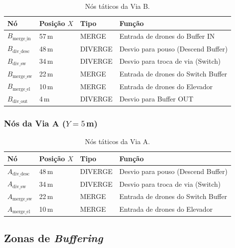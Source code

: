 \documentclass[12pt,a4paper]{article}
\begin{document}
\begin{table}[H]
\centering
\caption{Nós táticos da Via B.}
\label{tab:nos_via_b}
\begin{tabular}{@{}llll@{}}
\toprule
\textbf{Nó} & \textbf{Posição $X$} & \textbf{Tipo} & \textbf{Função} \\
\midrule
$B_{\text{merge\_in}}$  & 57\,m & MERGE   & Entrada de drones do Buffer IN \\
$B_{\text{div\_desc}}$  & 48\,m & DIVERGE & Desvio para pouso (Descend Buffer) \\
$B_{\text{div\_sw}}$    & 34\,m & DIVERGE & Desvio para troca de via (Switch) \\
$B_{\text{merge\_sw}}$  & 22\,m & MERGE   & Entrada de drones do Switch Buffer \\
$B_{\text{merge\_el}}$  & 10\,m & MERGE   & Entrada de drones do Elevador \\
$B_{\text{div\_out}}$   &  4\,m & DIVERGE & Desvio para Buffer OUT \\
\bottomrule
\end{tabular}
\end{table}

\subsubsection{Nós da Via A ($Y = 5$\,m)}

\begin{table}[H]
\centering
\caption{Nós táticos da Via A.}
\label{tab:nos_via_a}
\begin{tabular}{@{}llll@{}}
\toprule
\textbf{Nó} & \textbf{Posição $X$} & \textbf{Tipo} & \textbf{Função} \\
\midrule
$A_{\text{div\_desc}}$  & 48\,m & DIVERGE & Desvio para pouso (Descend Buffer) \\
$A_{\text{div\_sw}}$    & 34\,m & DIVERGE & Desvio para troca de via (Switch) \\
$A_{\text{merge\_sw}}$  & 22\,m & MERGE   & Entrada de drones do Switch Buffer \\
$A_{\text{merge\_el}}$  & 10\,m & MERGE   & Entrada de drones do Elevador \\
\bottomrule
\end{tabular}
\end{table}

\subsection{Zonas de \textit{Buffering}}
\end{document}
